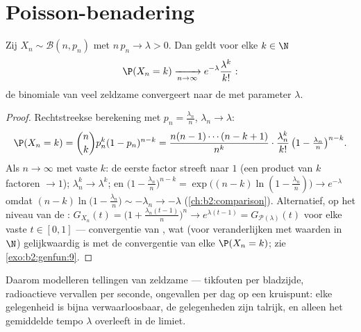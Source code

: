 \section{Poisson-benadering}

\begin{theorem}\label{thm:b2:genfun:rareevents}
Zij $X_n \sim \mathcal{B}(n, p_n)$ met $n\,p_n \to \lambda > 0$.
Dan geldt voor elke $k \in \N$
\[
\P(X_n = k)
\xrightarrow[n\to\infty]{}
e^{-\lambda}\frac{\lambda^k}{k!} :
\]
de binomiale  van veel zeldzame  convergeert naar de  met parameter
$\lambda$.
\end{theorem}

\begin{proof}
Rechtstreekse berekening met $p_n = \frac{\lambda_n}{n}$,
$\lambda_n \to \lambda$:
\[
\P(X_n = k)
= \binom nk p_n^k(1 - p_n)^{n-k}
= \frac{n(n-1)\cdots(n-k+1)}{n^k}\cdot
\frac{\lambda_n^k}{k!}\,
\bigl(1 - \tfrac{\lambda_n}{n}\bigr)^{n-k} .
\]
Als $n \to \infty$ met vaste $k$: de eerste factor streeft naar $1$
(een product van $k$ factoren $\to 1$); $\lambda_n^k \to
\lambda^k$; en $\bigl(1 - \frac{\lambda_n}{n}\bigr)^{n-k} =
\exp\bigl((n-k)\ln(1 - \frac{\lambda_n}{n})\bigr) \to e^{-\lambda}$
omdat $(n - k)\ln\bigl(1 - \frac{\lambda_n}{n}\bigr) \sim
-\lambda_n \to -\lambda$ (\cref{ch:b2:comparison}). Alternatief, op
het niveau van de : $G_{X_n}(t) = \bigl(1 +
\frac{\lambda_n(t-1)}{n}\bigr)^n \to e^{\lambda(t - 1)} =
G_{\mathcal{P}(\lambda)}(t)$ voor elke vaste $t \in [0, 1]$ ---
convergentie van , wat (voor veranderlijken met
waarden in $\N$) gelijkwaardig is met de convergentie van elke
$\P(X_n = k)$; zie \cref{exo:b2:genfun:9}.
\end{proof}

\begin{remark}
Daarom modelleren  tellingen van zeldzame
 --- tikfouten per bladzijde, radioactieve
vervallen per seconde, ongevallen per dag op een kruispunt: elke
gelegenheid is bijna verwaarloosbaar, de gelegenheden zijn talrijk,
en alleen het gemiddelde tempo $\lambda$ overleeft in de limiet.
\end{remark}

